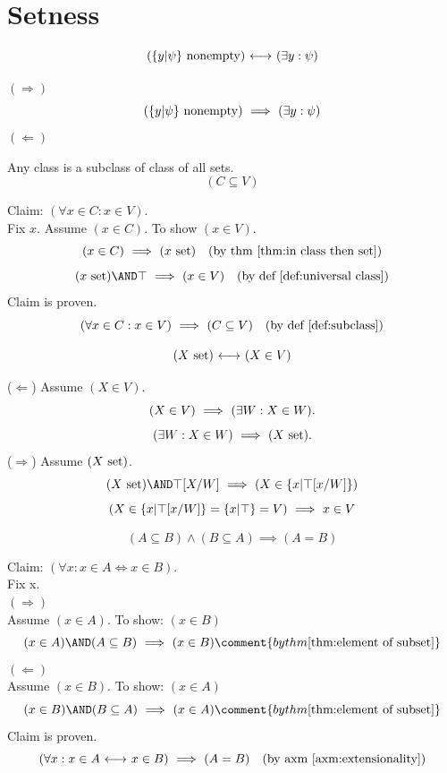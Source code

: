 \def\topic{}

\section{Setness}
\iftrue
\begin{theorem}
\[
(\{y|\psi\}\mathrm{\ nonempty})
{\ \longleftrightarrow\ }
(\exists y:\psi)
\]
\end{theorem}
\Proof
\noindent$(\Rightarrow)$\\
\[
(\{y|\psi\}\mathrm{\ nonempty})
\ \Longrightarrow\ 
(\exists y:\psi)
\]
\noindent$(\Leftarrow)$\\
\Done
\fi

\begin{theorem}
Any class is a subclass of class of all sets.
\[(C\subseteq V)\]
\end{theorem}
\Proof
Claim: $(\forall x\in C:x\in V)$.\\
Fix $x$. Assume $(x\in C)$. To show $(x\in V)$.
\[
(x\in C)
\ \Longrightarrow\ 
(x\mathrm{\ set})
\quad\mbox{(by thm \ref{thm:in class then set})}
\]
\[
(x\set)
\AND
\top
\IMPLIES
(x\in V)
\quad\mbox{(by def \ref{def:universal class})}
\]
Claim is proven.
\[
(\forall x\in C:x\in V)
\ \Longrightarrow\ 
(C\subseteq V)
\quad\mbox{(by def \ref{def:subclass})}
\]
\Done

\begin{theorem}
\label{thm:sets are in V}
\[
(X\mathrm{\ set}){\ \longleftrightarrow\ }(X\in V)
\]
\end{theorem}
\Proof
\noindent($\Leftarrow$) Assume $(X\in V)$.
\[
(X\in V)\ \Longrightarrow\ (\exists W: X\in W).
\]
\[
(\exists W: X\in W)\ \Longrightarrow\ (X\mathrm{\ set}).
\]
\noindent($\Rightarrow$) Assume $(X\mathrm{\ set})$.
\[
(X\set)\AND\top[X/W]\IMPLIES(X\in \{x|\top[x/W]\})
\]
\[
(X\in \{x|\top[x/W]\}=\{x|\top\}=V)\ \Longrightarrow\  x\in V
\]
\Done
\begin{theorem}
\[
(A \subseteq B)\land (B\subseteq A) \implies (A=B)
\]
\end{theorem}
\Proof
Claim: $(\forall x:x\in A \iff x\in B)$.\\
Fix x.\\
$(\Rightarrow)$\\
Assume $(x\in A)$. To show: $(x\in B)$\\
\[
(x\in A)
\AND
(A\subseteq B)
\IMPLIES
(x\in B)
\comment{by thm \ref{thm:element of subset}}
\]
$(\Leftarrow)$\\
Assume $(x\in B)$. To show: $(x\in A)$\\
\[
(x\in B)
\AND
(B\subseteq A)
\IMPLIES
(x\in A)
\comment{by thm \ref{thm:element of subset}}
\]
Claim is proven.
\[
(\forall x:x\in A {\ \longleftrightarrow\ } x\in B)
\ \Longrightarrow\ 
(A=B)
\quad\mbox{(by axm \ref{axm:extensionality})}
\]
\Done

